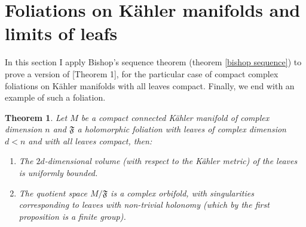 \documentclass[letterpaper]{book}
\newtheorem{theorem}{Theorem}[section]
\begin{document}
\section{Foliations on Kähler manifolds and limits of leafs}

\noindent In this section I apply Bishop's sequence theorem (theorem \ref{bishop sequence}) to prove a version of \cite{EMS}[Theorem 1], for the particular case of compact complex foliations on K\"ahler manifolds with all leaves compact. Finally, we end with an example of such a foliation.

\begin{theorem}\label{kahlerEMS}
        Let $M$ be a compact connected Kähler manifold
        of complex dimension $n$ and $\mathfrak{F}$ a holomorphic foliation
        with leaves of complex dimension $d<n$ and with all leaves compact,
        then:
\begin{enumerate}
        \item[1] The $2d$-dimensional volume (with
                respect to the Kähler metric) of the leaves is uniformly
                bounded.
        \item[2] The quotient space $M/\mathfrak{F}$ is a complex orbifold, with singularities corresponding to leaves
                with non-trivial holonomy (which by the first proposition is a finite group).
\end{enumerate}
\end{theorem}
\end{document}
